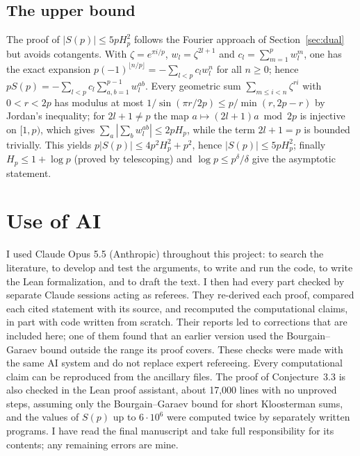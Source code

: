 \subsection*{The upper bound}
The proof of $|S(p)|\le5pH_p^2$ follows the Fourier approach of Section~\ref{sec:dual} but avoids cotangents. With $\zeta=e^{\pi i/p}$, $w_l=\zeta^{2l+1}$ and $c_l=\sum_{m=1}^pw_l^m$, one has the exact expansion $p(-1)^{\lfloor n/p\rfloor}=-\sum_{l<p}c_lw_l^n$ for all $n\ge 0$; hence $pS(p)=-\sum_{l<p}c_l\sum_{a,b=1}^{p-1}w_l^{ab}$. Every geometric sum $\sum_{m\le i<n}\zeta^{ri}$ with $0<r<2p$ has modulus at most $1/\sin(\pi r/2p)\le p/\min(r,2p-r)$ by Jordan's inequality; for $2l+1\ne p$ the map $a\mapsto(2l+1)a\bmod 2p$ is injective on $[1,p)$, which gives $\sum_a|\sum_bw_l^{ab}|\le 2pH_p$, while the term $2l+1=p$ is bounded trivially. This yields $p|S(p)|\le 4p^2H_p^2+p^2$, hence $|S(p)|\le 5pH_p^2$; finally $H_p\le 1+\log p$ (proved by telescoping) and $\log p\le p^\delta/\delta$ give the asymptotic statement.

\section*{Use of AI}

I used Claude Opus 5.5 (Anthropic) throughout this project: to search the literature, to develop and test the arguments, to write and run the code, to write the Lean formalization, and to draft the text. I then had every part checked by separate Claude sessions acting as referees. They re-derived each proof, compared each cited statement with its source, and recomputed the computational claims, in part with code written from scratch. Their reports led to corrections that are included here; one of them found that an earlier version used the Bourgain--Garaev bound outside the range its proof covers. These checks were made with the same AI system and do not replace expert refereeing. Every computational claim can be reproduced from the ancillary files. The proof of Conjecture~3.3 is also checked in the Lean proof assistant, about 17{,}000 lines with no unproved steps, assuming only the Bourgain--Garaev bound for short Kloosterman sums, and the values of $S(p)$ up to $6\cdot10^6$ were computed twice by separately written programs. I have read the final manuscript and take full responsibility for its contents; any remaining errors are mine.

